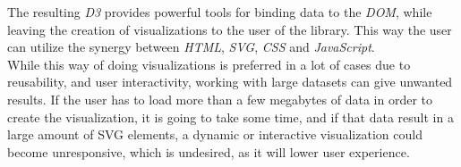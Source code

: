 \documentclass[Report.tex]{subfiles}
\begin{document}
	The resulting \emph{D3} provides powerful tools for binding data to the \emph{DOM}, while leaving the creation of visualizations to the user of the library. This way the user can utilize the synergy between \emph{HTML}, \emph{SVG}, \emph{CSS} and \emph{JavaScript}.\\
	
	
	While this way of doing visualizations is preferred in a lot of cases due to reusability, and user interactivity, working with large datasets can give unwanted results. 
	If the user has to load more than a few megabytes of data in order to create the visualization, it is going to take some time, and if that data result in a large amount of SVG elements, a dynamic or interactive visualization could become unresponsive, which is undesired, as it will lower user experience.
\end{document}
